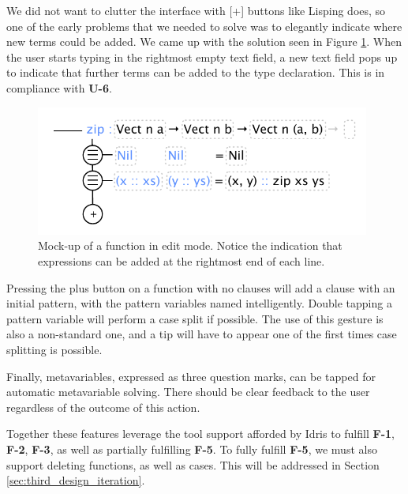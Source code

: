 
We did not want to clutter the interface with [+] buttons like Lisping does, so one of the early problems that we needed to solve was to elegantly indicate where new terms could be added.
We came up with the solution seen in Figure \ref{fig:initial_function_editing_design}.
When the user starts typing in the rightmost empty text field, a new text field pops up to indicate that further terms can be added to the type declaration. This is in compliance with \textbf{U-6}.

\begin{figure}
	\centering
		\includegraphics[width=110mm]{diagrams/initial_function_editing_design.pdf}
	\caption{Mock-up of a function in edit mode. Notice the indication that expressions can be
	added at the rightmost end of each line.}
\label{fig:initial_function_editing_design}
\end{figure}

Pressing the plus button on a function with no clauses will add a clause with an initial pattern, with the pattern variables named intelligently. 
Double tapping a pattern variable will perform a case split if possible. 
The use of this gesture is also a non-standard one, and a tip will have to appear one of the first times case splitting is possible.

Finally, metavariables, expressed as three question marks, can be tapped for automatic metavariable solving. 
There should be clear feedback to the user regardless of the outcome of this action.

Together these features leverage the tool support afforded by Idris to fulfill \textbf{F-1}, \textbf{F-2}, \textbf{F-3}, as well as partially fulfilling \textbf{F-5}. To fully fulfill \textbf{F-5}, we must also support deleting functions, as well as cases. This will be addressed in
Section\,\ref{sec:third_design_iteration}. 


